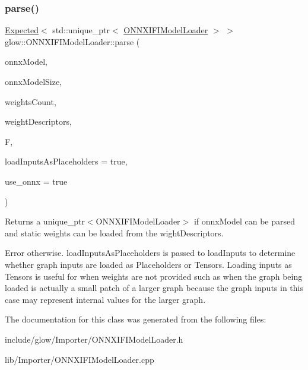 \subsubsection{\texorpdfstring{parse()}{parse()}}
{\footnotesize\ttfamily \hyperlink{classglow_1_1detail_1_1_glow_expected}{Expected}$<$ std\+::unique\+\_\+ptr$<$ \hyperlink{classglow_1_1_o_n_n_x_i_f_i_model_loader}{O\+N\+N\+X\+I\+F\+I\+Model\+Loader} $>$ $>$ glow\+::\+O\+N\+N\+X\+I\+F\+I\+Model\+Loader\+::parse (\begin{DoxyParamCaption}\item[{const void $\ast$}]{onnx\+Model,  }\item[{uint32\+\_\+t}]{onnx\+Model\+Size,  }\item[{uint32\+\_\+t}]{weights\+Count,  }\item[{const onnx\+Tensor\+Descriptor\+V1 $\ast$}]{weight\+Descriptors,  }\item[{\hyperlink{classglow_1_1_function}{Function} \&}]{F,  }\item[{bool}]{load\+Inputs\+As\+Placeholders = {\ttfamily true},  }\item[{bool}]{use\+\_\+onnx = {\ttfamily true} }\end{DoxyParamCaption})\hspace{0.3cm}{\ttfamily [static]}}

\begin{DoxyReturn}{Returns}
a unique\+\_\+ptr$<$\+O\+N\+N\+X\+I\+F\+I\+Model\+Loader$>$ if {\ttfamily onnx\+Model} can be parsed and static weights can be loaded from the {\ttfamily wight\+Descriptors}. 

Error otherwise. {\ttfamily load\+Inputs\+As\+Placeholders} is passed to load\+Inputs to determine whether graph inputs are loaded as Placeholders or Tensors. Loading inputs as Tensors is useful for when weights are not provided such as when the graph being loaded is actually a small patch of a larger graph because the graph inputs in this case may represent internal values for the larger graph. 
\end{DoxyReturn}


The documentation for this class was generated from the following files\+:\begin{DoxyCompactItemize}
\item 
include/glow/\+Importer/O\+N\+N\+X\+I\+F\+I\+Model\+Loader.\+h\item 
lib/\+Importer/O\+N\+N\+X\+I\+F\+I\+Model\+Loader.\+cpp\end{DoxyCompactItemize}
